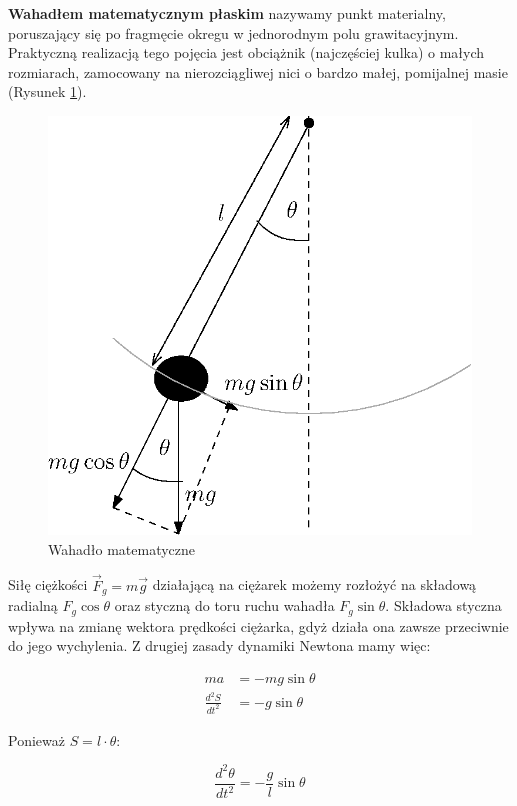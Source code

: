 \documentclass[a4paper]{article}
\begin{document}
\textbf{Wahadłem matematycznym płaskim} nazywamy punkt materialny, poruszający się po
fragmęcie okregu w jednorodnym polu grawitacyjnym. Praktyczną realizacją tego pojęcia
jest obciążnik (najczęściej kulka) o małych rozmiarach, zamocowany na nierozciągliwej
nici o bardzo małej, pomijalnej masie (Rysunek \ref{wahadlo_matematyczne}).

\begin{figure}[h!]
\centering
\includegraphics[scale=0.8]{wahadlo.eps}
\caption{Wahadło matematyczne}
\label{wahadlo_matematyczne}
\end{figure}

Siłę ciężkości $\vec{F}_g = m\vec{g}$ działającą na ciężarek możemy rozłożyć na
składową radialną $F_g \cos \theta$ oraz styczną do toru ruchu wahadła $F_g \sin \theta$.
Składowa styczna wpływa na zmianę wektora prędkości ciężarka, gdyż działa ona
zawsze przeciwnie do jego wychylenia. Z drugiej zasady dynamiki Newtona mamy więc:

\begin{align*}
 ma &= -mg\sin\theta \\
 \frac{d^2S}{dt^2} &= -g\sin\theta
\end{align*}

Ponieważ $S = l \cdot \theta$:

\[ \frac{d^2\theta}{dt^2} = -\frac{g}{l}\sin\theta \]
\end{document}
